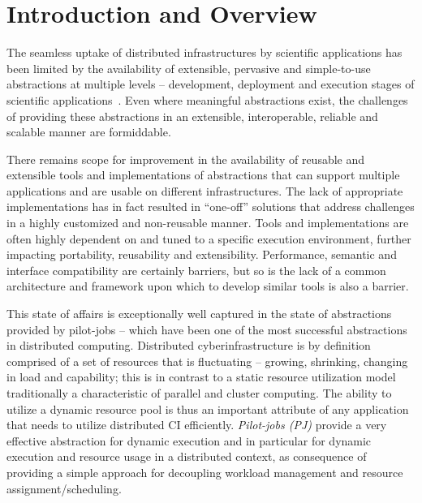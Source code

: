\documentclass[conference,final]{IEEEtran}
\newcommand{\upp}{\vspace*{-0.5em}}
\begin{document}
\section{Introduction and Overview \upp\upp} 

The seamless uptake of distributed infrastructures by scientific
applications has been limited by the availability of extensible,
pervasive and simple-to-use abstractions at multiple levels –
development, deployment and execution stages of scientific
applications~\cite{dpagrid2009}.  Even where meaningful abstractions
exist, the challenges of providing these abstractions in an
extensible, interoperable, reliable and scalable manner are
formiddable.  

There remains scope for improvement in the availability of reusable
and extensible tools and implementations of abstractions that can
support multiple applications and are usable on different
infrastructures.  The lack of appropriate implementations has in fact
resulted in “one-off” solutions that address challenges in a highly
customized and non-reusable manner.  Tools and implementations are
often highly dependent on and tuned to a specific execution
environment, further impacting portability, reusability and
extensibility.  Performance, semantic and interface compatibility are
certainly barriers, but so is the lack of a common architecture and
framework upon which to develop similar tools is also a barrier.



This state of affairs is exceptionally well captured in the state of
abstractions provided by pilot-jobs -- which have been one of the most
successful abstractions in distributed computing. Distributed
cyberinfrastructure is by definition comprised of a set of resources
that is fluctuating -- growing, shrinking, changing in load and
capability; this is in contrast to a static resource utilization model
traditionally a characteristic of parallel and cluster computing.  The
ability to utilize a dynamic resource pool is thus an important
attribute of any application that needs to utilize distributed CI
efficiently. \emph{Pilot-jobs (PJ)} provide a very effective
abstraction for dynamic execution and in particular for dynamic
execution and resource usage in a distributed context, as consequence
of providing a simple approach for decoupling workload management and
resource assignment/scheduling.
\end{document}

